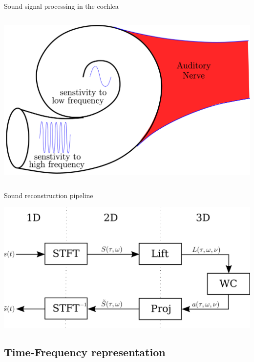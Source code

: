 \documentclass[10pt,american,ignorenonframetext,aspectratio=1610]{beamer}
\theoremstyle{remark}
\begin{document}
\begin{frame}{Sound signal processing in the cochlea}
\begin{columns}[T]
\begin{column}{0.3\textwidth}
\par\vspace{1em}\par

\includegraphics{img/cochlea.png}
\end{column}
\end{columns}

\end{frame}

\begin{frame}{Sound reconstruction pipeline}
\protect\hypertarget{sound-reconstruction-pipeline}{}

\includegraphics[width=1\textwidth,height=\textheight]{img/pipeline.png}

\end{frame}

\hypertarget{time-frequency-representation}{%
\subsection{Time-Frequency
representation}\label{time-frequency-representation}}
\end{document}
